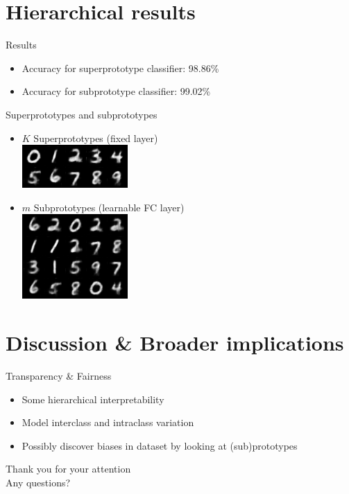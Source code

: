 \documentclass{beamer}[169]
\begin{document}
\section{Hierarchical results}
\begin{frame}{Results}
\begin{itemize}
    \item Accuracy for superprototype classifier: 98.86\% %
    \item Accuracy for subprototype classifier:  99.02\%
\end{itemize}
\end{frame}
\begin{frame}{Superprototypes and subprototypes}
\begin{itemize}
 \item $K$ Superprototypes (fixed layer) \\   \includegraphics[scale=0.9]{img/hier42prot1499.png}

 \item $m$ Subprototypes (learnable FC layer) \\   \includegraphics[scale=0.9]{img/hier42subprot1499.png}
\end{itemize}
\end{frame}

\section{Discussion \& Broader implications}
\begin{frame}{Transparency \& Fairness}
    \begin{itemize}
        \item Some hierarchical interpretability
        \item Model interclass and intraclass variation
        \item Possibly discover biases in dataset by looking at (sub)prototypes
    \end{itemize}
\end{frame}


\begin{frame}[plain]

\advance\textwidth2cm
\hsize\textwidth
\columnwidth\textwidth
\huge
\alert{Thank you for your attention}\pause \\
Any questions?
\end{frame}
\end{document}
